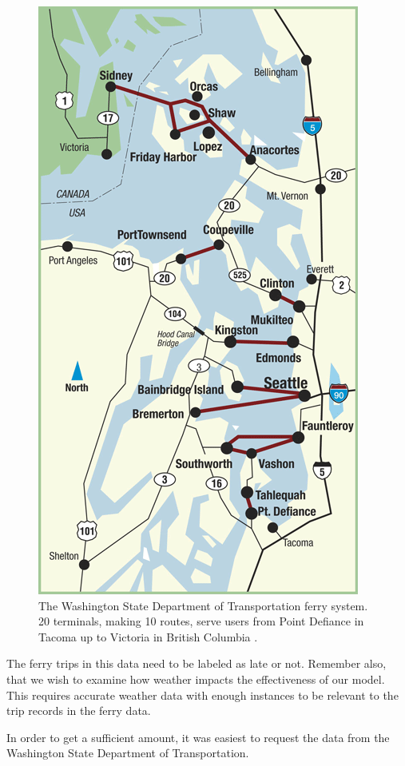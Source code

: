\documentclass[11pt]{article} %
\begin{document}
\begin{figure}
  \centering
  \includegraphics[scale=.4]{images/route-map-overview.png}
  \caption{The Washington State Department of Transportation ferry system. 20
  terminals, making 10 routes, serve users from Point Defiance in Tacoma up to
  Victoria in British Columbia \cite{wsdotVesselWatch}.}
  \label{fig:ferry_system}
\end{figure}

The ferry trips in this data 
need to be labeled as late or not. Remember also, that we wish to examine how
weather impacts the effectiveness of our model.  This requires accurate weather
data with enough instances to be relevant to the trip records in the ferry data.

In order to get a sufficient amount, it was
easiest to request the data from the Washington State Department of Transportation.
 
\end{document}
